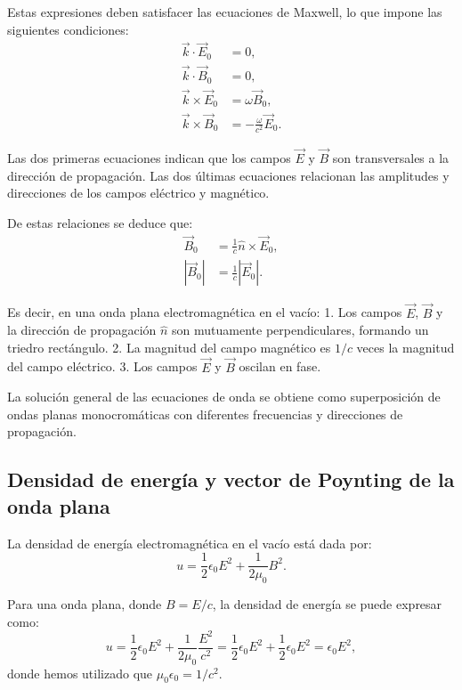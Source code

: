\documentclass[12pt,a4paper]{book}
\begin{document}
Estas expresiones deben satisfacer las ecuaciones de Maxwell, lo que impone las siguientes condiciones:
\begin{align}
\vec{k} \cdot \vec{E}_0 &= 0, \\
\vec{k} \cdot \vec{B}_0 &= 0, \\
\vec{k} \times \vec{E}_0 &= \omega \vec{B}_0, \\
\vec{k} \times \vec{B}_0 &= -\frac{\omega}{c^2} \vec{E}_0.
\end{align}

Las dos primeras ecuaciones indican que los campos $\vec{E}$ y $\vec{B}$ son transversales a la dirección de propagación. Las dos últimas ecuaciones relacionan las amplitudes y direcciones de los campos eléctrico y magnético.

De estas relaciones se deduce que:
\begin{align}
\vec{B}_0 &= \frac{1}{c}\hat{n} \times \vec{E}_0, \\
|\vec{B}_0| &= \frac{1}{c}|\vec{E}_0|.
\end{align}

Es decir, en una onda plana electromagnética en el vacío:
1. Los campos $\vec{E}$, $\vec{B}$ y la dirección de propagación $\hat{n}$ son mutuamente perpendiculares, formando un triedro rectángulo.
2. La magnitud del campo magnético es $1/c$ veces la magnitud del campo eléctrico.
3. Los campos $\vec{E}$ y $\vec{B}$ oscilan en fase.

La solución general de las ecuaciones de onda se obtiene como superposición de ondas planas monocromáticas con diferentes frecuencias y direcciones de propagación.

\subsection{Densidad de energía y vector de Poynting de la onda plana}

La densidad de energía electromagnética en el vacío está dada por:
\begin{equation}
u = \frac{1}{2}\epsilon_0 E^2 + \frac{1}{2\mu_0}B^2.
\end{equation}

Para una onda plana, donde $B = E/c$, la densidad de energía se puede expresar como:
\begin{equation}
u = \frac{1}{2}\epsilon_0 E^2 + \frac{1}{2\mu_0}\frac{E^2}{c^2} = \frac{1}{2}\epsilon_0 E^2 + \frac{1}{2}\epsilon_0 E^2 = \epsilon_0 E^2,
\end{equation}
donde hemos utilizado que $\mu_0 \epsilon_0 = 1/c^2$.
\end{document}
